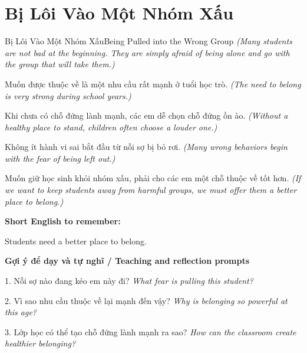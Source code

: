 \section{Bị Lôi Vào Một Nhóm Xấu}
\begin{truyen}{Bị Lôi Vào Một Nhóm Xấu}{Being Pulled into the Wrong Group}
\textit{(Many students are not bad at the beginning. They are simply afraid of being alone and go with the group that will take them.)}

Muốn được thuộc về là một nhu cầu rất mạnh ở tuổi học trò.
\textit{(The need to belong is very strong during school years.)}

Khi chưa có chỗ đứng lành mạnh, các em dễ chọn chỗ đứng ồn ào.
\textit{(Without a healthy place to stand, children often choose a louder one.)}

Không ít hành vi sai bắt đầu từ nỗi sợ bị bỏ rơi.
\textit{(Many wrong behaviors begin with the fear of being left out.)}

\end{truyen}

\begin{baihoc}
Muốn giữ học sinh khỏi nhóm xấu, phải cho các em một chỗ thuộc về tốt hơn.
\textit{(If we want to keep students away from harmful groups, we must offer them a better place to belong.)}
\end{baihoc}

\begin{ghinhoanh}
\textbf{Short English to remember:}

Students need a better place to belong.

\end{ghinhoanh}

\begin{tuhocnhanh}
\textbf{Gợi ý để dạy và tự nghĩ / Teaching and reflection prompts}

1. Nỗi sợ nào đang kéo em này đi? \textit{What fear is pulling this student?}

2. Vì sao nhu cầu thuộc về lại mạnh đến vậy? \textit{Why is belonging so powerful at this age?}

3. Lớp học có thể tạo chỗ đứng lành mạnh ra sao? \textit{How can the classroom create healthier belonging?}
\end{tuhocnhanh}
\ngancach

